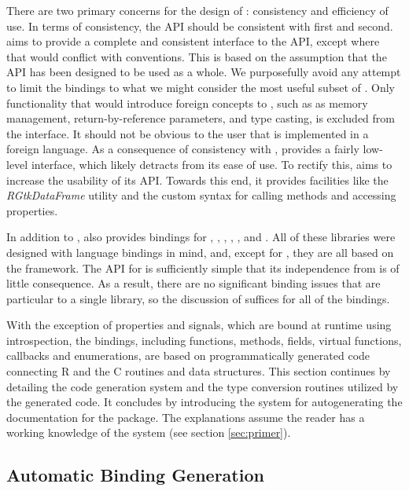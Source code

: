 \documentclass[article]{jss}
\begin{document}
There are two primary concerns for the design of :
consistency
and efficiency of use. In terms of consistency, the API should be
consistent 
with  first and  second.  aims to
provide a 
complete and consistent interface to the  API, except where
that would
conflict with  conventions. This is based on the
assumption that the
 API has been designed to be used as a whole. We
purposefully avoid 
any attempt to limit the bindings to what we might consider the most
useful 
subset of . Only functionality that would introduce foreign
concepts
to , such as as memory management, return-by-reference
parameters, 
and type casting, is excluded from the  interface. It
should not be
obvious to the user that  is implemented in a foreign
language.
As a consequence of consistency with ,  provides
a fairly 
low-level interface, which likely detracts from its ease of use. To
rectify
this,  aims to increase the usability of its API. 
Towards this end, it provides facilities like the \emph{RGtkDataFrame}
utility 
and the custom syntax for calling methods and accessing properties. 

In addition to ,  also provides bindings for
, , , , , and
.  All of these libraries were designed with language
bindings in mind, and, except for , they are all based on
the  framework.  The API for  is sufficiently
simple that its independence from  is of little
consequence. As a result, there are no significant binding issues that
are particular to a single library, so the discussion of 
suffices for all of the bindings.

With the exception of properties and signals, which are bound at
runtime using introspection, the  bindings, including
functions, methods, fields, virtual functions, callbacks and
enumerations, are based on programmatically generated code connecting
R and the C routines and data structures.  This section continues by
detailing the code
generation system and the type conversion routines utilized by the
generated code. It concludes by introducing the system for
autogenerating the  documentation for the package. The
explanations assume the reader has a working knowledge of
the  system (see section \ref{sec:primer}).

\subsection{Automatic Binding Generation}
\end{document}

